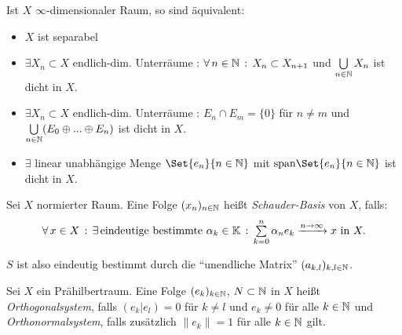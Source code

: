 \documentclass{cheat-sheet}
\newcommand{\K}{\mathbb{K}}
\begin{document}
\begin{lem}
  Ist $X$ $\infty$-dimensionaler Raum, so sind äquivalent:
  \begin{itemize}
    \item $X$ ist separabel
    \item $\exists X_n \subset X$ endlich-dim. Unterräume : $\forall \, {n \in \mathbb{N}} \,:\, X_n \subset X_{n{+}1}$ und $\bigcup_{n \in \N} X_n$ ist dicht in $X$.
    \item $\exists X_n \subset X$ endlich-dim. Unterräume : $E_n \cap E_m = \{ 0 \}$ für $n \not= m$ und $\bigcup_{n \in \N} (E_0 \oplus ... \oplus E_n)$ ist dicht in $X$.
    \item $\exists$ linear unabhängige Menge $\Set{ e_n }{ n \in \N }$ mit $\mathrm{span}\Set{e_n}{ n \in \N }$ ist dicht in $X$.
  \end{itemize}
\end{lem}


\begin{defn}
  Sei $X$ normierter Raum. Eine Folge $(x_n)_{n \in \mathbb{N}}$ heißt \emph{Schauder-Basis} von $X$, falls:
  \[ \fa{x \in X} \ex{\text{eindeutige bestimmte } \alpha_k \in \K} \sum_{k=0}^n \alpha_n e_k \xrightarrow{n \to \infty} x \text{ in } X. \]
\end{defn}


$S$ ist also eindeutig bestimmt durch die "`unendliche Matrix"' $(a_{k,l})_{k,l \in \mathbb{N}}$.


\begin{defn}
  Sei $X$ ein Prähilbertraum. Eine Folge $(e_k)_{k \in \mathbb{N}}$, $N \subset \mathbb{N}$ in $X$ heißt \emph{Orthogonalsystem}, falls $(e_k | e_l) = 0$ für $k \not= l$ und $e_k \not= 0$ für alle $k \in \mathbb{N}$ und \emph{Orthonormalsystem}, falls zusätzlich $\|e_k\| = 1$ für alle $k \in \mathbb{N}$ gilt.
\end{defn}
\end{document}
